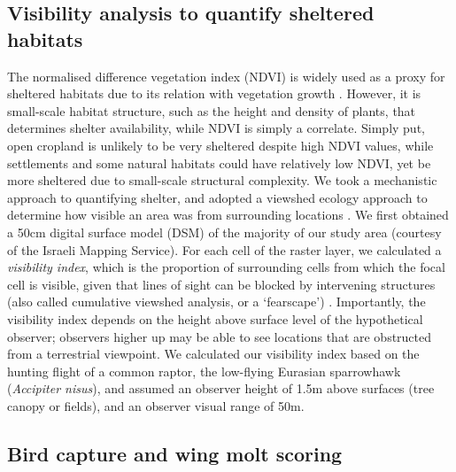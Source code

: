 \subsection*{Visibility analysis to quantify sheltered habitats}
The normalised difference vegetation index (NDVI) is widely used as a proxy for sheltered habitats due to its relation with vegetation growth \citep{pettorelli2011}.
However, it is small-scale habitat structure, such as the height and density of plants, that determines shelter availability, while NDVI is simply a correlate. 
Simply put, open cropland is unlikely to be very sheltered despite high NDVI values, while settlements and some natural habitats could have relatively low NDVI, yet be more sheltered due to small-scale structural complexity.
We took a mechanistic approach to quantifying shelter, and adopted a viewshed ecology approach to determine how visible an area was from surrounding locations \citep{aben2018,aben2021}.
We first obtained a 50cm digital surface model (DSM) of the majority of our study area (courtesy of the Israeli Mapping Service).
For each cell of the raster layer, we calculated a \textit{visibility index}, which is the proportion of surrounding cells from which the focal cell is visible, given that lines of sight can be blocked by intervening structures (also called cumulative viewshed analysis, or a `fearscape') \cite{olsoy2015}.
Importantly, the visibility index depends on the height above surface level of the hypothetical observer; observers higher up may be able to see locations that are obstructed from a terrestrial viewpoint.
We calculated our visibility index based on the hunting flight of a common raptor, the low-flying Eurasian sparrowhawk (\textit{Accipiter nisus}), and assumed an observer height of 1.5m above surfaces (tree canopy or fields), and an observer visual range of 50m.

\subsection*{Bird capture and wing molt scoring}

